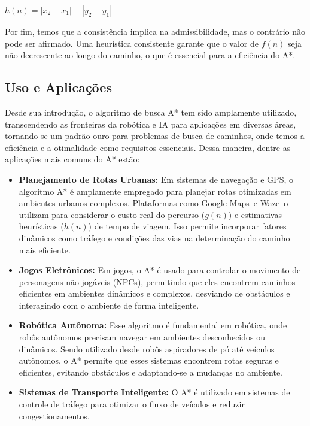 \documentclass[conference]{IEEEtran}
\begin{document}
\begin{center}
  $h(n) = |x_2 - x_1| + |y_2 - y_1|$
\end{center}

Por fim, temos que a consistência implica na admissibilidade, mas o contrário não pode ser afirmado. Uma heurística consistente garante que o valor de $f(n)$ seja não decrescente ao longo do caminho, o que é essencial para a eficiência do A*.

\subsection{Uso e Aplicações}

Desde sua introdução, o algoritmo de busca A* tem sido amplamente utilizado, transcendendo as fronteiras da robótica e IA para aplicações em diversas áreas, tornando-se um padrão ouro para problemas de busca de caminhos, onde temos a eficiência e a otimalidade como requisitos essenciais. Dessa maneira, dentre as aplicações mais comuns do A* estão:

\begin{itemize}
    \item \textbf{Planejamento de Rotas Urbanas:} Em sistemas de navegação e GPS, o algoritmo A* é amplamente empregado para planejar rotas otimizadas em ambientes urbanos complexos. Plataformas como Google Maps\textregistered\ e Waze\textregistered\ o utilizam para considerar o custo real do percurso ($g(n)$) e estimativas heurísticas ($h(n)$) de tempo de viagem. Isso permite incorporar fatores dinâmicos como tráfego e condições das vias na determinação do caminho mais eficiente.
    \item \textbf{Jogos Eletrônicos:} Em jogos, o A* é usado para controlar o movimento de personagens não jogáveis (NPCs), permitindo que eles encontrem caminhos eficientes em ambientes dinâmicos e complexos, desviando de obstáculos e interagindo com o ambiente de forma inteligente.
    \item \textbf{Robótica Autônoma:} Esse algoritmo é fundamental em robótica, onde robôs autônomos precisam navegar em ambientes desconhecidos ou dinâmicos. Sendo utilizado desde robôs aspiradores de pó até veículos autônomos, o A* permite que esses sistemas encontrem rotas seguras e eficientes, evitando obstáculos e adaptando-se a mudanças no ambiente.
    \item \textbf{Sistemas de Transporte Inteligente:} O A* é utilizado em sistemas de controle de tráfego para otimizar o fluxo de veículos e reduzir congestionamentos.
\end{itemize}
\end{document}
